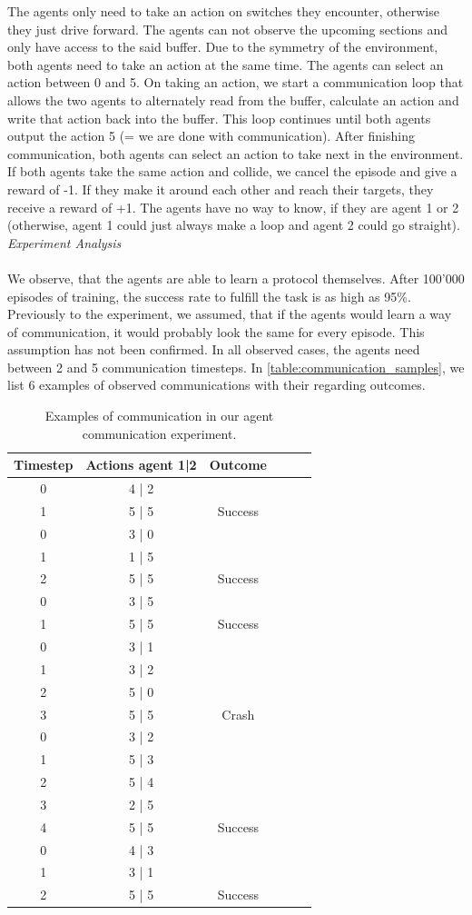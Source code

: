 The agents only need to take an action on switches they encounter, otherwise they just drive forward. The agents can not observe the upcoming sections and only have access to the said buffer. Due to the symmetry of the environment, both agents need to take an action at the same time. The agents can select an action between 0 and 5. On taking an action, we start a communication loop that allows the two agents to alternately read from the buffer, calculate an action and write that action back into the buffer. This loop continues until both agents output the action 5 (= we are done with communication). After finishing communication, both agents can select an action to take next in the environment. If both agents take the same action and collide, we cancel the episode and give a reward of -1. If they make it around each other and reach their targets, they receive a reward of +1. The agents have no way to know, if they are agent 1 or 2 (otherwise, agent 1 could just always make a loop and agent 2 could go straight).\newpage
\textit{Experiment Analysis}\\\\
We observe, that the agents are able to learn a protocol themselves. After 100'000 episodes of training, the success rate to fulfill the task is as high as 95\%. Previously to the experiment, we assumed, that if the agents would learn a way of communication, it would probably look the same for every episode. This assumption has not been confirmed. In all observed cases, the agents need between 2 and 5 communication timesteps. In \autoref{table:communication_samples}, we list 6 examples of observed communications with their regarding outcomes.
\begin{table}[H]
	\centering
	\begin{tabular}{ |c|c|c|c|c|c| } 
		\hline
		\textbf{Timestep} 
		& \textbf{Actions agent 1|2} 
		& \textbf{Outcome}\\
		\hline
		0 & 4 | 2 &\\
		1 & 5 | 5 & Success\\
		\hline
		0 & 3 | 0 &\\
		1 & 1 | 5 &\\
		2 & 5 | 5 & Success\\
		\hline
		0 & 3 | 5 &\\
		1 & 5 | 5 & Success\\
		\hline
		0 & 3 | 1 &\\
		1 & 3 | 2 &\\
		2 & 5 | 0 &\\
		3 & 5 | 5 & Crash\\
		\hline
		0 & 3 | 2 &\\
		1 & 5 | 3 &\\
		2 & 5 | 4 &\\
		3 & 2 | 5 &\\
		4 & 5 | 5 & Success\\
		\hline
		0 & 4 | 3 &\\
		1 & 3 | 1 &\\
		2 & 5 | 5 & Success\\
		\hline
	\end{tabular}
	\caption{Examples of communication in our agent communication experiment.}
	\label{table:communication_samples}
\end{table}
